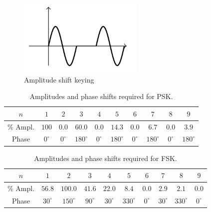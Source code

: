 \begin{itemize}[leftmargin = 50pt]
\begin{figure}[H]
    \centering
    \includegraphics[scale = 0.8]{Images/FS8.PNG}
    \caption{Amplitude shift keying}
    \label{fig:FS8}
\end{figure}

        \begin{table}[H]
            \centering 
            \caption{Amplitudes and phase shifts required for PSK.}
            \begin{tabular}{|c|c|c|c|c|c|c|c|c|c|}
                \hline
                $n$ & $1$ & $2$ & $3$ & $4$ & $5$ & $6$ & $7$ & $8$ & $9$ \\ \hline
                \% Ampl. & $100$ & $0.0 $& $60.0$ & $0.0$ & $14.3$ & $0.0$ & $6.7$ & $0.0$ & $3.9$ \\ 
                Phase & $0^{\circ}$ & $0^{\circ}$ & $180^{\circ}$ & $0^{\circ}$ & $180^{\circ}$ & $0^{\circ}$ & $180^{\circ}$ & $0^{\circ}$ & $180^{\circ}$ \\ \hline
            \end{tabular}
            \label{tab:FS6}
        \end{table}

        \begin{table}[H]
            \centering 
            \caption{Amplitudes and phase shifts required for FSK.}
            \begin{tabular}{|c|c|c|c|c|c|c|c|c|c|}
                \hline
                $n$ & $1$ & $2$ & $3$ & $4$ & $5$ & $6$ & $7$ & $8$ & $9$ \\ \hline
                \% Ampl. & $56.8$ & $100.0 $& $41.6$ & $22.0$ & $8.4$ & $0.0$ & $2.9$ & $2.1$ & $0.0$ \\ 
                Phase & $30^{\circ}$ & $150^{\circ}$ & $90^{\circ}$ & $30^{\circ}$ & $330^{\circ}$ & $0^{\circ}$ & $30^{\circ}$ & $330^{\circ}$ & $0^{\circ}$ \\ \hline
            \end{tabular}
            \label{tab:FS7}
        \end{table}


\end{itemize}
